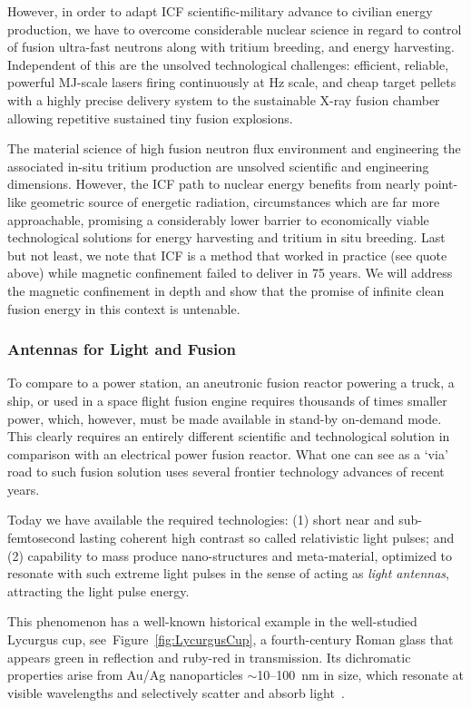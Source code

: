 \documentclass[particles,article,accept,pdftex,moreauthors]{Definitions/mdpi}
\newcommand{\rf}[1]{Figure~\ref{#1}}
\begin{document}
However, in order to adapt ICF scientific-military advance to civilian energy production, we have to overcome considerable nuclear science in regard to control of fusion ultra-fast neutrons along with tritium breeding, and energy harvesting. Independent of this are the unsolved technological challenges: efficient, reliable, powerful MJ-scale lasers firing continuously at Hz scale, and cheap target pellets with a highly precise delivery system to the sustainable X-ray fusion chamber allowing repetitive sustained tiny fusion explosions.

The material science of high fusion neutron flux environment and engineering the associated in-situ tritium production are unsolved scientific and engineering dimensions. However, the ICF path to nuclear energy benefits from nearly point-like geometric source of energetic radiation, circumstances which are far more approachable, promising a considerably lower barrier to economically viable technological solutions for energy harvesting and tritium in situ breeding. Last but not least, we note that ICF is a method that worked in practice (see quote above) while magnetic confinement failed to deliver in 75 years. We will address the magnetic confinement in depth and show that the promise of infinite clean fusion energy in this context is untenable.

\subsubsection{Antennas for Light and Fusion}\label{sssec:nanoF}
To compare to a power station, an aneutronic fusion reactor powering a truck, a ship, or used in a space flight fusion engine requires thousands of times smaller power, which, however, must be made available in stand-by on-demand mode. This clearly requires an entirely different scientific and technological solution in comparison with an electrical power fusion reactor. What one can see as a `via' road to such fusion solution uses several frontier technology advances of recent years. 

Today we have available the required technologies: (1) short near and sub-femtosecond lasting coherent high contrast so called relativistic light pulses; and (2) capability to mass produce nano-structures and meta-material, optimized to resonate with such extreme light pulses in the sense of acting as {\em light antennas}, attracting the light pulse energy.

This phenomenon has a well-known historical example in the well-studied Lycurgus cup, see~\rf{fig:LycurgusCup}, a fourth-century Roman glass that appears green in reflection and ruby-red in transmission. Its dichromatic properties arise from Au/Ag nanoparticles $\sim$10--100~nm in size, which resonate at visible wavelengths and selectively scatter and absorb light~\cite{freestone2007lycurgus}. 
\end{document}
